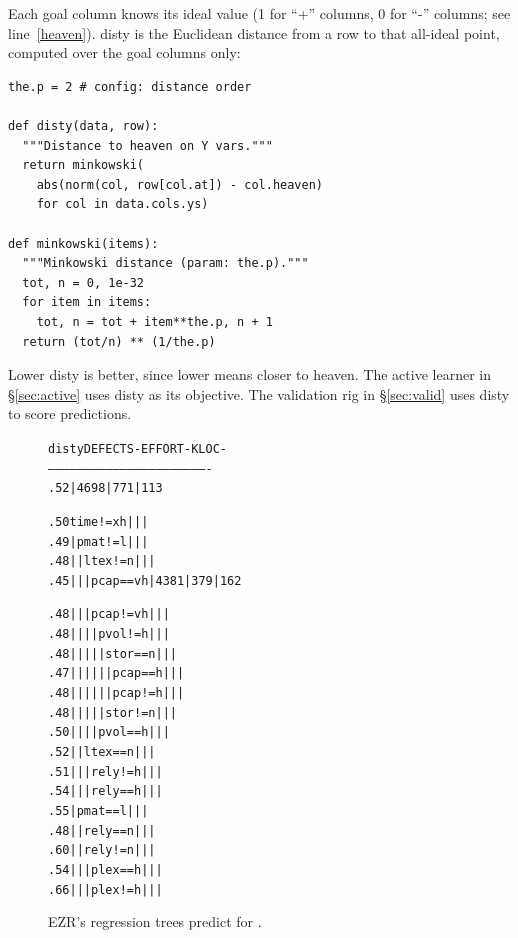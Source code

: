 \documentclass[AMA,STIX2COL]{WileyNJDv5}
\newcommand{\disc}[2][black]{%
  \tikz[baseline=(c.base)]%
    \node[circle, fill=#1, draw=#1,
          inner sep=0pt, minimum size=1.2ex,
          text=white, font=\tiny\bfseries]
    (c) {#2};%
}
\newcommand{\rc}[1]{%
  \iftoggle{rcred}{\disc[red]{#1}}{\disc[black]{#1}}%
}
\begin{document}
Each goal column knows its ideal value (1 for ``+'' columns, 0
for ``-'' columns; see line~\ref{heaven}). \textsf{disty} is the
Euclidean distance from a row to that all-ideal point, computed
over the goal columns only:

\begin{verbatim}
the.p = 2 # config: distance order

def disty(data, row):
  """Distance to heaven on Y vars."""
  return minkowski(
    abs(norm(col, row[col.at]) - col.heaven)
    for col in data.cols.ys)

def minkowski(items):
  """Minkowski distance (param: the.p)."""
  tot, n = 0, 1e-32
  for item in items:
    tot, n = tot + item**the.p, n + 1
  return (tot/n) ** (1/the.p)
\end{verbatim}

Lower \textsf{disty} is better, since lower means closer to
heaven. The active learner in \S\ref{sec:active} uses
\textsf{disty} as its objective. The validation rig in
\S\ref{sec:valid} uses \textsf{disty} to score predictions.


\begin{figure}[!b]
{\fontsize{6pt}{7.2pt}\selectfont
\begin{alltt}
disty                                  DEFECTS-   EFFORT-   KLOC- 
-------------------------------------------------------------------
.52                                |    4698  |    771  |  113 \rc{1}
.50    time != xh                  |          |         |
.49    |  pmat != l                |          |         |
.48    |  |  ltex != n             |          |         |
.45    |  |  |  pcap == vh         |    4381  |    379  |  162 \rc{2}
.48    |  |  |  pcap != vh         |          |         |
.48    |  |  |  |  pvol != h       |          |         |
.48    |  |  |  |  |  stor == n    |          |         |
.47    |  |  |  |  |  |  pcap == h |          |         |
.48    |  |  |  |  |  |  pcap != h |          |         |
.48    |  |  |  |  |  stor != n    |          |         |
.50    |  |  |  |  pvol == h       |          |         |
.52    |  |  ltex == n             |          |         |
.51    |  |  |  rely != h          |          |         |
.54    |  |  |  rely == h          |          |         |
.55    |  pmat == l                |          |         |
.48    |  |  rely == n             |          |         |
.60    |  |  rely != n             |          |         |
.54    |  |  |  plex == h          |          |         |
.66    |  |  |  plex != h          |          |         |
\end{alltt}
}
\caption{EZR's regression trees predict for  .}\label{htree}
\end{figure}
\end{document}
